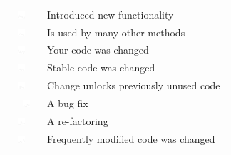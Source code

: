 \begin{table}[t!]
\begin{tabular}{ll}
\vspace{-2pt}\includegraphics[height=10px, width=30px]{figures/sparkles/change-introduced-new-functionality.pdf} & Introduced new functionality\\
\vspace{-2pt}\includegraphics[height=10px, width=30px]{figures/sparkles/code-is-used-by-many-other-methods.pdf} & Is used by many other methods\\
\vspace{-2pt}\includegraphics[height=10px, width=30px]{figures/sparkles/your-code-was-changed.pdf} & Your code was changed \\
\vspace{-2pt}\includegraphics[height=10px, width=30px]{figures/sparkles/stable-code-was-changed.pdf} & Stable code was changed\\
\vspace{-2pt}\includegraphics[height=10px, width=30px]{figures/sparkles/change-unlocks-previously-unused-code.pdf} & Change unlocks previously unused code\\\
\vspace{-2pt}\includegraphics[height=10px, width=30px]{figures/sparkles/change-was-a-bug-fix.pdf} & A bug fix\\	
\vspace{-2pt}\includegraphics[height=10px, width=30px]{figures/sparkles/change-was-a-re-factoring.pdf} & A re-factoring\\ 
\vspace{-2pt}\includegraphics[height=10px, width=30px]{figures/sparkles/frequently-modified-code-was-changed.pdf} & Frequently modified code was changed \\

\end{tabular}
\end{table}
